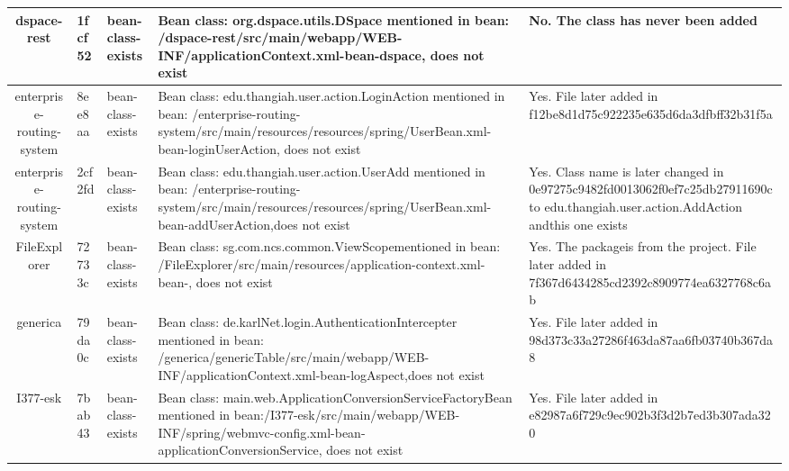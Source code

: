 \begin{longtable}{|c|l|l|p{6cm}|p{3cm}|}
\hline
dspace-rest & 1fcf52 & bean-class-exists & Bean class: org.dspace.utils.DSpace men\allowbreak tioned in bean: /dspace-rest/src/main/we\allowbreak bapp/WEB-INF/applicationContext.xml-bean\allowbreak -dspace, does not exist & No. The class ha\allowbreak s never been adde\allowbreak d \\
\hline
enterprise-routing-system & 8ee8aa & bean-class-exists & Bean class: edu.thangiah.user.action.Lo\allowbreak ginAction mentioned in bean: /enterprise\allowbreak -routing-system/src/main/resources/resou\allowbreak rces/spring/UserBean.xml-bean-loginUserA\allowbreak ction, does not exist & Yes. File later \allowbreak added in f12be8d1\allowbreak d75c922235e635d6d\allowbreak a3dfbff32b31f5a \\
\hline
enterprise-routing-system & 2cf2fd & bean-class-exists & Bean class: edu.thangiah.user.action.Us\allowbreak erAdd mentioned in bean: /enterprise-rou\allowbreak ting-system/src/main/resources/resources\allowbreak /spring/UserBean.xml-bean-addUserAction,\allowbreak  does not exist & Yes. Class name \allowbreak is later changed \allowbreak in 0e97275c9482fd\allowbreak 0013062f0ef7c25db\allowbreak 27911690c to edu.\allowbreak thangiah.user.act\allowbreak ion.AddAction and\allowbreak  this one exists \\
\hline
FileExplorer & 72733c & bean-class-exists & Bean class: sg.com.ncs.common.ViewScope\allowbreak  mentioned in bean: /FileExplorer/src/ma\allowbreak in/resources/application-context.xml-bea\allowbreak n-, does not exist & Yes. The package\allowbreak  is from the proj\allowbreak ect. File later a\allowbreak dded in 7f367d643\allowbreak 4285cd2392c890977\allowbreak 4ea6327768c6ab \\
\hline
generica & 79da0c & bean-class-exists & Bean class: de.karlNet.login.Authentica\allowbreak tionIntercepter mentioned in bean: /gene\allowbreak rica/genericTable/src/main/webapp/WEB-IN\allowbreak F/applicationContext.xml-bean-logAspect,\allowbreak  does not exist & Yes. File later \allowbreak added in 98d373c3\allowbreak 3a27286f463da87aa\allowbreak 6fb03740b367da8 \\
\hline
I377-esk & 7bab43 & bean-class-exists & Bean class: main.web.ApplicationConvers\allowbreak ionServiceFactoryBean mentioned in bean:\allowbreak  /I377-esk/src/main/webapp/WEB-INF/sprin\allowbreak g/webmvc-config.xml-bean-applicationConv\allowbreak ersionService, does not exist & Yes. File later \allowbreak added in e82987a6\allowbreak f729c9ec902b3f3d2\allowbreak b7ed3b307ada320 \\

\end{longtable}

